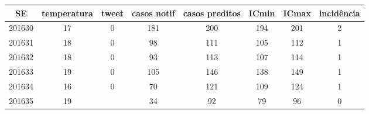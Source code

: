 \begin{tabular}{c|ccccccc}
  \hline
SE & temperatura & tweet & casos notif & casos preditos & ICmin & ICmax & incidência \\ 
  \hline
201630 & 17 & 0 & 181 & 200 & 194 & 201 & 2 \\ 
  201631 & 18 & 0 & 98 & 111 & 105 & 112 & 1 \\ 
  201632 & 18 & 0 & 93 & 113 & 107 & 114 & 1 \\ 
  201633 & 19 & 0 & 105 & 146 & 138 & 149 & 1 \\ 
  201634 & 16 & 0 & 70 & 121 & 109 & 124 & 1 \\ 
  201635 & 19 &  & 34 & 92 & 79 & 96 & 0 \\ 
   \hline
\end{tabular}
